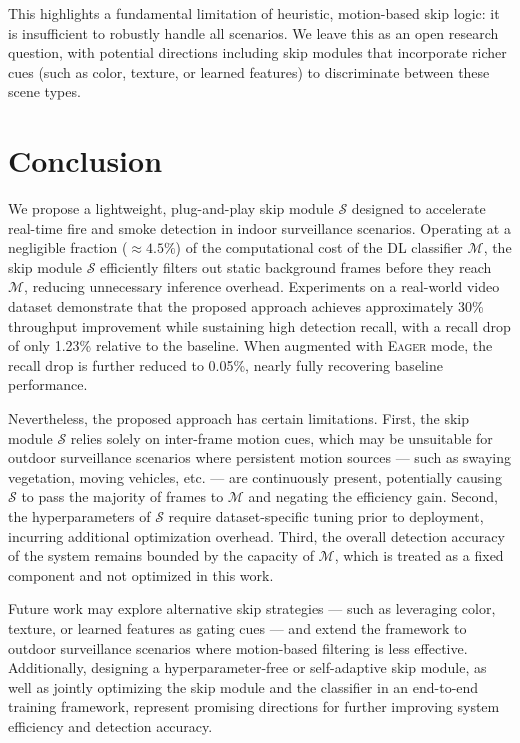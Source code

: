 \documentclass[final,3p,times,twocolumn]{elsarticle}
\begin{document}
This highlights a fundamental limitation of heuristic, motion-based
skip logic: it is insufficient to robustly handle all scenarios. We
leave this as an open research question, with potential directions
including skip modules that incorporate richer cues (such as color,
texture, or learned features) to discriminate between these scene
types.

\section{Conclusion}\label{sec:conclusion}

We propose a lightweight, plug-and-play skip module $\mathcal{S}$
designed to accelerate real-time fire and smoke detection in indoor
surveillance scenarios. Operating at a negligible fraction
(${\approx}4.5\%$) of the computational cost of the DL classifier
$\mathcal{M}$, the skip module $\mathcal{S}$ efficiently filters out
static background frames before they reach $\mathcal{M}$, reducing
unnecessary inference overhead. Experiments on a real-world video
dataset demonstrate that the proposed approach achieves approximately
30\% throughput improvement while sustaining high detection recall,
with a recall drop of only 1.23\% relative to the baseline. When
augmented with \textsc{Eager} mode, the recall drop is further reduced
to 0.05\%, nearly fully recovering baseline performance.

Nevertheless, the proposed approach has certain limitations. First, the
skip module $\mathcal{S}$ relies solely on inter-frame motion cues,
which may be unsuitable for outdoor surveillance scenarios where
persistent motion sources --- such as swaying vegetation, moving
vehicles, etc. --- are continuously present, potentially causing
$\mathcal{S}$ to pass the majority of frames to $\mathcal{M}$ and
negating the efficiency gain. Second, the hyperparameters of
$\mathcal{S}$ require dataset-specific tuning prior to deployment,
incurring additional optimization overhead. Third, the overall
detection accuracy of the system remains bounded by the capacity of
$\mathcal{M}$, which is treated as a fixed component and not optimized
in this work.

Future work may explore alternative skip strategies --- such as
leveraging color, texture, or learned features as gating cues --- and
extend the framework to outdoor surveillance scenarios where
motion-based filtering is less effective. Additionally, designing a
hyperparameter-free or self-adaptive skip module, as well as jointly
optimizing the skip module and the classifier in an end-to-end training
framework, represent promising directions for further improving system
efficiency and detection accuracy.
\end{document}
